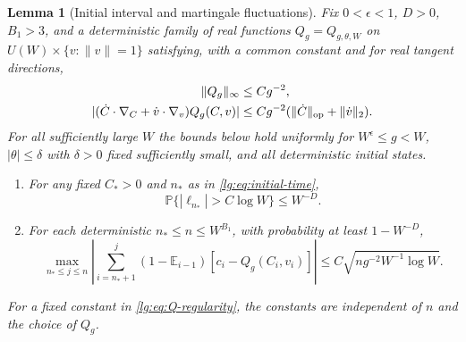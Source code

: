 \documentclass[11pt]{article}
\numberwithin{equation}{section}
\newtheorem{lemma}[theorem]{Lemma}
\theoremstyle{remark}
\newcommand{\E}{\mathbb E}
\newcommand{\Prob}{\mathbb P}
\begin{document}
\begin{lemma}[Initial interval and martingale fluctuations]\label{lg:lem:fluctuations}
Fix $0<\epsilon<1$, $D>0$, $B_1>3$, and a deterministic family of real
functions $Q_g=Q_{g,\theta,W}$ on $U(W)\times\{v:\|v\|=1\}$ satisfying,
with a common constant and for real tangent directions,
\begin{equation}\label{lg:eq:Q-regularity}
 \begin{aligned}
 \|Q_g\|_\infty&\le Cg^{-2},\\
 |(\dot C\cdot\nabla_C+\dot v\cdot\nabla_v)Q_g(C,v)|
 &\le Cg^{-2}(\|\dot C\|_{\rm op}+\|\dot v\|_2).
 \end{aligned}
\end{equation}
For all sufficiently large $W$ the bounds below hold uniformly for
$W^\epsilon\le g<W$, $|\theta|\le\delta$ with $\delta>0$ fixed sufficiently small,
and all deterministic initial states.
\begin{enumerate}
\item For any fixed $C_*>0$ and $n_*$ as in \eqref{lg:eq:initial-time},
\begin{equation}\label{lg:eq:initial-segment}
 \Prob\{|\ell_{n_*}|>C\log W\}\le W^{-D}.
\end{equation}
\item For each deterministic $n_*\le n\le W^{B_1}$, with probability
at least $1-W^{-D}$,
\begin{equation}\label{lg:eq:centerMGF}
 \max_{n_*\le j\le n}\left|
       \sum_{i=n_*+1}^j(1-\E_{i-1})[c_i-Q_g(C_i,v_i)]\right|
       \le C\sqrt{ng^{-2}W^{-1}\log W}.
\end{equation}
\end{enumerate}
For a fixed constant in \eqref{lg:eq:Q-regularity}, the constants
are independent of $n$ and the choice of $Q_g$.
\end{lemma}
\end{document}
